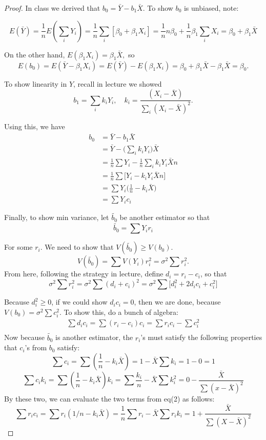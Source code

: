 \documentclass[12pt]{article}
\begin{document}
\begin{proof}
In class we derived that $b_0 = \bar{Y} - b_1\bar{X}.$ To show $b_0$ is unbiased, note:

$$E(\bar{Y}) = \frac{1}{n} E(\sum_i Y_i) = \frac{1}{n}\sum_i [\beta_0 + \beta_1X_i] = \frac{1}{n} n \beta_0 + \frac{1}{n}\beta_1 \sum_i X_i = \beta_0 + \beta_1\bar{X}$$

On the other hand, $E(\beta_1 X_i) = \beta_1\bar{X},$ so 
$$E(b_0) = E(\bar{Y} - \beta_1X_i) = E(\bar{Y}) - E(\beta_1X_i) = \beta_0 + \beta_1\bar{X} - \beta_1\bar{X} = \beta_0.$$ 

To show linearity in $Y$, recall in lecture we showed $$b_1 = \sum_i k_iY_i, \quad k_i = \frac{(X_i - \bar{X})}{\sum_i (X_i - \bar{X})^2}.$$

Using this, we have 
\begin{equation}
\begin{split}
b_0 
&= \bar{Y} - b_1 \bar{X}\\
&= \bar{Y} - \big(\sum_i k_iY_i\big)\bar{X}\\
&= \frac{1}{n}\sum Y_i - \frac{1}{n}\sum_i k_iY_i \bar{X} n\\
&= \frac{1}{n}\sum\big[Y_i - k_iY_i\bar{X}n\big]\\
&= \sum Y_i \big(\frac{1}{n} - k_i\bar{X}\big) \\
&= \sum Y_i c_i
\end{split}
\end{equation}

Finally, to show min variance, let $\widetilde{b_0}$ be another estimator so that 
$$\widetilde{b_0} = \sum Y_ir_i$$

For some $r_i$. We need to show that $V(\widetilde{b_0}) \geq V(b_0).$ 
$$V(\widetilde{b_0}) = \sum V(Y_i)r_i^2 = \sigma^2 \sum r_i^2.$$
From here, following the strategy in lecture, define $d_i = r_i - c_i$, so that 
$$\sigma^2 \sum r_i^2 = \sigma^2 \sum (d_i + c_i)^2 = \sigma^2 \sum\Big[ d_i^2 + 2d_ic_i + c_i^2 \Big]$$

Because $d_i^2 \geq 0$, if we could show $d_ic_i = 0$, then we are done, because $V(b_0) = \sigma^2 \sum c_i^2$. To show this, do a bunch of algebra:
\begin{equation}
\begin{split}
\sum d_i c_i =\sum (r_i - c_i)c_i = \sum r_ic_i - \sum c_i^2\\ 
\end{split}
\end{equation}
Now because $\widetilde{b_0}$ is another estimator, the $r_i$'s must satisfy the following properties that $c_i$'s from $b_0$ satisfy:
$$\sum c_i = \sum(\frac{1}{n} - k_i \bar{X}) = 1-\bar{X}\sum k_i = 1 - 0 = 1$$
$$\sum c_ik_i = \sum (\frac{1}{n} - k_i \bar{X})k_i = \sum \frac{k_i}{n} - \bar{X}\sum k_i^2 = 0 - \frac{\bar{X}}{\sum(x-\bar{X})^2}$$
By these two, we can evaluate the two terms from eq(2) as follows:
$$\sum r_i c_i = \sum r_i(1/n - k_i \bar{X}) = \frac{1}{n}\sum r_i - \bar{X} \sum r_ik_i = 1 + \frac{\bar{X}}{\sum(X-\bar{X})^2}$$


\end{proof}
\end{document}
